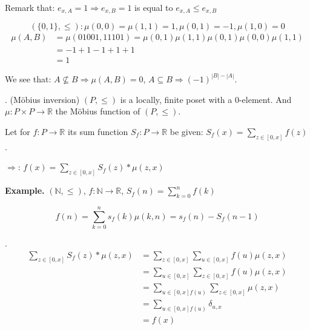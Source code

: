 Remark that: $e_{x,A} = 1 \Rightarrow e_{x,B} = 1$ is equal to $e_{x,A} \leq e_{x,B}$

\[
    ( \{0,1\}, \leq): \mu(0,0) = \mu(1,1) = 1, \mu(0,1) = -1, \mu(1,0) = 0
\]
\begin{align*}
    \mu(A,B) &= \mu(01001, 11101) = \mu(0,1) \mu(1,1) \mu(0,1) \mu(0,0) \mu(1,1) \\
    &= -1 +1 -1 +1 +1 \\
    &= 1
\end{align*}

We see that:
$A\not\subseteq B \Rightarrow \mu(A,B) = 0$,
$A\subseteq B \Rightarrow (-1)^{|B| - |A|}$.

\Theorem.
(Möbius inversion)
$(P, \leq)$ is a locally, finite poset with a 0-element.
And $\mu: P \times P \rightarrow \mathbb{R}$ the Möbius function of $(P, \leq)$.

Let for $f: P \rightarrow \mathbb{R}$ its sum function $S_f: P \rightarrow \mathbb{R}$ be given: $S_f(x) = \sum_{z \in [0,x]} f(z)$.

$\Rightarrow$: $f(x) = \sum_{z \in [0,x]} S_f(z) * \mu(z,x)$

\textbf{Example.}
$(\mathbb{N}, \leq)$, $f: \mathbb{N} \rightarrow \mathbb{R}$, $S_f(n) = \sum_{k=0}^{n} f(k)$

\[
  f(n) = \sum_{k=0}^{n} s_f(k) \mu(k,n) = s_f(n) - S_f(n-1)
\]

\Proof.
\begin{align*}
    \sum_{z \in [0,x]} S_f(z) * \mu(z,x)
    &= \sum_{z \in [0,x]} \sum_{u \in [0,x]} f(u) \mu(z,x) \\
    &= \sum_{u \in [0,x]} \sum_{z \in [0,x]} f(u) \mu(z,x) \\
    &= \sum_{u \in [0,x] f(u)} \sum_{z \in [0,x]} \mu(z,x) \\
    &= \sum_{u \in [0,x] f(u)} \delta_{u,x} \\
    &= f(x)
\end{align*}



